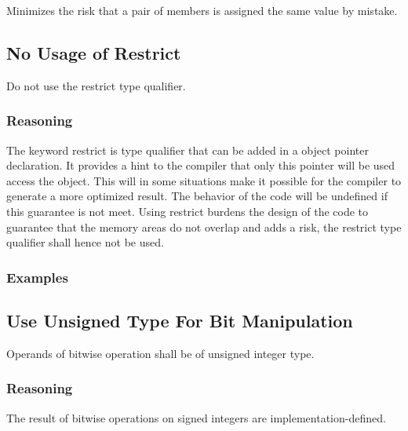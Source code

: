 \documentclass{article}
\begin{document}
Minimizes the risk that a pair of members is assigned the same value by mistake.
\begin{minipage}[t]{0.47\linewidth}

\end{minipage}
\hfill
\begin{minipage}[t]{0.47\linewidth}

\end{minipage}

\subsection{No Usage of Restrict}

Do not use the restrict type qualifier.

\subsubsection{Reasoning}

The keyword restrict is type qualifier that can be added in a object pointer declaration. It provides a hint to the compiler that only this pointer will be used access the object. This will in some situations make it possible for the compiler to generate a more optimized result. The behavior of the code will be undefined if this guarantee is not meet. Using restrict burdens the design of the code to guarantee that the memory areas do not overlap and adds a risk, the restrict type qualifier shall hence not be used.

\subsubsection{Examples}

\begin{minipage}[t]{0.47\linewidth}

\end{minipage}
\hfill
\begin{minipage}[t]{0.47\linewidth}

\end{minipage}

\subsection{Use Unsigned Type For Bit Manipulation}

Operands of bitwise operation shall be of unsigned integer type.

\subsubsection{Reasoning}

The result of bitwise operations on signed integers are implementation-defined.





\end{document}
